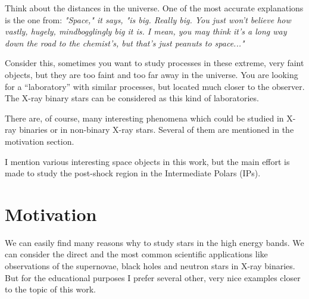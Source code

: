 \documentclass[oneside,a4paper,11pt]{report}
\begin{document}
Think about the distances in the universe. One of the most accurate explanations is the one from: \cite{hitch:1}  
\textit{"Space," it says, "is big. Really big. You just won't believe how vastly, 
hugely, mindbogglingly big it is. I mean, you may think it's a long way down the road to the 
chemist's, but that's just peanuts to space..."} 

Consider this, sometimes you want to study processes in these extreme, very faint objects, 
but they are too faint and too far away in the universe. You are looking for a “laboratory” with similar
 processes, but located much closer to the observer. The X-ray binary stars can be considered as this kind of 
laboratories.  

There are, of course, many interesting phenomena which could be studied in X-ray binaries or in non-binary X-ray stars. 
Several of them are mentioned in the motivation section. 

I mention various interesting space objects in this work, but the main effort is made to 
study the post-shock region in the Intermediate Polars (IPs).   


\section{Motivation}
We can easily find many reasons why to study stars in the high energy bands.  
We can consider the direct and the most common scientific applications like observations of 
the supernovae, black holes and neutron stars in X-ray binaries. But for the educational purposes 
I prefer several other, very nice examples closer to the topic of this work.  
\end{document}
